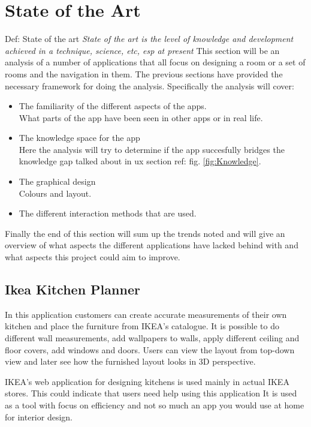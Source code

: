 
\section{State of the Art}\label{SOTA}
Def: State of the art
\textit{ State of the art is the level of knowledge and development achieved in a technique, science, etc, esp at present }
\newline
This section will be an analysis of a number of applications that all focus on designing a room or a set of rooms and the navigation in them. The previous sections have provided the necessary framework for doing the analysis. Specifically the analysis will cover:

\begin{itemize}
\item The familiarity of the different aspects of the apps.\\
What parts of the app have been seen in other apps or in real life. 
\item The knowledge space for the app\\
Here the analysis will try to determine if the app succesfully bridges the knowledge gap talked about in ux section ref: fig. \ref{fig:Knowledge}.
\item The graphical design\\
Colours and layout.
\item The different interaction methods that are used. 
\end{itemize}
 Finally the end of this section will sum up the trends noted and will give an overview of what aspects the different applications have lacked behind with and what aspects this project could aim to improve. 

\subsection{Ikea Kitchen Planner}
In this application customers can create accurate measurements of their own kitchen and place the furniture from IKEA's catalogue. It is possible to do different wall measurements, add wallpapers to walls, apply different ceiling and floor covers, add windows and doors. Users can view the layout from top-down view and later see how the furnished layout looks in 3D perspective.

IKEA's web application for designing kitchens is used mainly in actual IKEA stores. This could indicate that users need help using this application It is used as a tool with focus on efficiency and not so much an app you would use at home for interior design.

